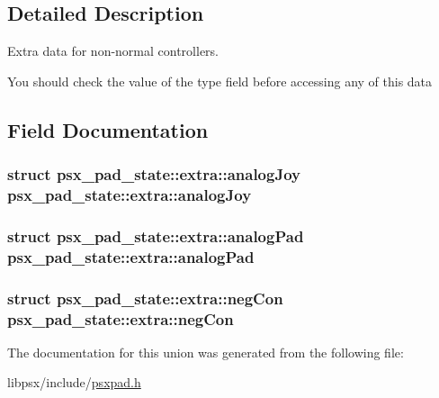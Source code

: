 \subsection{Detailed Description}
Extra data for non-\/normal controllers. 

You should check the value of the type field before accessing any of this data 

\subsection{Field Documentation}
\hypertarget{unionpsx__pad__state_1_1extra_a371441709cf4b2cde155a14098f31d78}{}
\subsubsection[{analog\+Joy}]{\setlength{\rightskip}{0pt plus 5cm}struct {\bf psx\+\_\+pad\+\_\+state\+::extra\+::analog\+Joy} {\bf psx\+\_\+pad\+\_\+state\+::extra\+::analog\+Joy}}\label{unionpsx__pad__state_1_1extra_a371441709cf4b2cde155a14098f31d78}
\hypertarget{unionpsx__pad__state_1_1extra_a695297f806918f29e75ce3b60b8a023c}{}
\subsubsection[{analog\+Pad}]{\setlength{\rightskip}{0pt plus 5cm}struct {\bf psx\+\_\+pad\+\_\+state\+::extra\+::analog\+Pad} {\bf psx\+\_\+pad\+\_\+state\+::extra\+::analog\+Pad}}\label{unionpsx__pad__state_1_1extra_a695297f806918f29e75ce3b60b8a023c}
\hypertarget{unionpsx__pad__state_1_1extra_add4e14f1a60c319b3db982fc94fa0bba}{}
\subsubsection[{neg\+Con}]{\setlength{\rightskip}{0pt plus 5cm}struct {\bf psx\+\_\+pad\+\_\+state\+::extra\+::neg\+Con} {\bf psx\+\_\+pad\+\_\+state\+::extra\+::neg\+Con}}\label{unionpsx__pad__state_1_1extra_add4e14f1a60c319b3db982fc94fa0bba}


The documentation for this union was generated from the following file\+:\begin{DoxyCompactItemize}
\item 
libpsx/include/\hyperlink{psxpad_8h}{psxpad.\+h}\end{DoxyCompactItemize}
